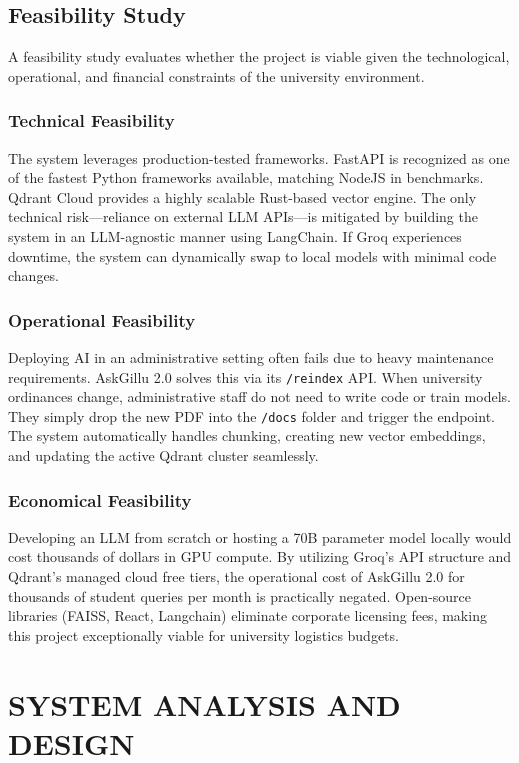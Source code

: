 \documentclass[12pt,a4paper]{report}
\begin{document}
\section{Feasibility Study}
A feasibility study evaluates whether the project is viable given the technological, operational, and financial constraints of the university environment.

\subsection{Technical Feasibility}
The system leverages production-tested frameworks. FastAPI is recognized as one of the fastest Python frameworks available, matching NodeJS in benchmarks. Qdrant Cloud provides a highly scalable Rust-based vector engine. The only technical risk---reliance on external LLM APIs---is mitigated by building the system in an LLM-agnostic manner using LangChain. If Groq experiences downtime, the system can dynamically swap to local models with minimal code changes.

\subsection{Operational Feasibility}
Deploying AI in an administrative setting often fails due to heavy maintenance requirements. AskGillu 2.0 solves this via its \texttt{/reindex} API. When university ordinances change, administrative staff do not need to write code or train models. They simply drop the new PDF into the \texttt{/docs} folder and trigger the endpoint. The system automatically handles chunking, creating new vector embeddings, and updating the active Qdrant cluster seamlessly.

\subsection{Economical Feasibility}
Developing an LLM from scratch or hosting a 70B parameter model locally would cost thousands of dollars in GPU compute. By utilizing Groq's API structure and Qdrant's managed cloud free tiers, the operational cost of AskGillu 2.0 for thousands of student queries per month is practically negated. Open-source libraries (FAISS, React, Langchain) eliminate corporate licensing fees, making this project exceptionally viable for university logistics budgets.

\chapter{SYSTEM ANALYSIS AND DESIGN}
\end{document}
